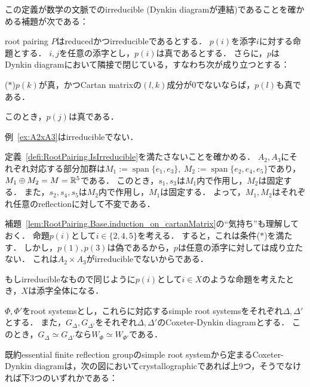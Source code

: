 この定義が数学の文脈でのirreducible (Dynkin diagramが連結)であることを確かめる補題が次である：

\begin{lemma}
  \label{lem:RootPairing.Base.induction_on_cartanMatrix}
  \leanok
  root pairing $P$はreducedかつirreducibleであるとする．
  $p(i)$を添字$i$に対する命題とする．
  $i, j$を任意の添字とし，$p(i)$は真であるとする．
  さらに，$p$はDynkin diagramにおいて隣接で閉じている，すなわち次が成り立つとする：
  \begin{center}
    ($\ast$)\quad $p(k)$が真，かつCartan matrixの$(l, k)$成分が$0$でないならば，$p(l)$も真である．
  \end{center}
  このとき，$p(j)$は真である．
\end{lemma}

\begin{example}
  例~\ref{ex:A2xA3}はirreducibleでない．

  定義~\ref{defi:RootPairing.IsIrreducible}を満たさないことを確かめる．
  $A_2, A_3$にそれぞれ対応する部分加群は$M_1 := \operatorname{span}\{e_1, e_3\},\ M_2 := \operatorname{span}\{e_2, e_4, e_5\}$であり，$M_1 \oplus M_2 = M = \mathbb{R}^5$である．
  このとき，$s_1, s_3$は$M_1$内で作用し，$M_2$は固定する．
  また，$s_2, s_4, s_5$は$M_2$内で作用し，$M_1$は固定する．
  よって，$M_1, M_2$はそれぞれ任意のreflectionに対して不変である．

  補題~\ref{lem:RootPairing.Base.induction_on_cartanMatrix}の``気持ち''も理解しておく．
  命題$p(i)$として$i \in \{2, 4, 5\}$を考える．
  すると，これは条件($\ast$)を満たす．
  しかし，$p(1), p(3)$は偽であるから，$p$は任意の添字に対しては成り立たない．
  これは$A_2 \times A_3$がirreducibleでないからである．

  もしirreducibleなもので同じように$p(i)$として$i \in X$のような命題を考えたとき，$X$は添字全体になる．
\end{example}

\begin{theorem}
  \label{thm:diag_is_simeq_implies_FRG_is_simeq}
  $\Phi, \Phi'$をroot systemsとし，これらに対応するsimple root systemsをそれぞれ$\Delta, \Delta'$とする．
  また，$G_\Delta, G_{\Delta'}$をそれぞれ$\Delta, \Delta'$のCoxeter-Dynkin diagramとする．
  このとき，$G_\Delta \simeq G_{\Delta'}$なら$W_\Phi \simeq W_{\Phi'}$である．
\end{theorem}

\begin{theorem}
  \label{thm:coxeter_diag_classification}
  既約essential finite reflection groupのsimple root systemから定まるCoxeter-Dynkin diagramは，次の図においてcrystallographicであれば上9つ，そうでなければ下3つのいずれかである：
\end{theorem}


